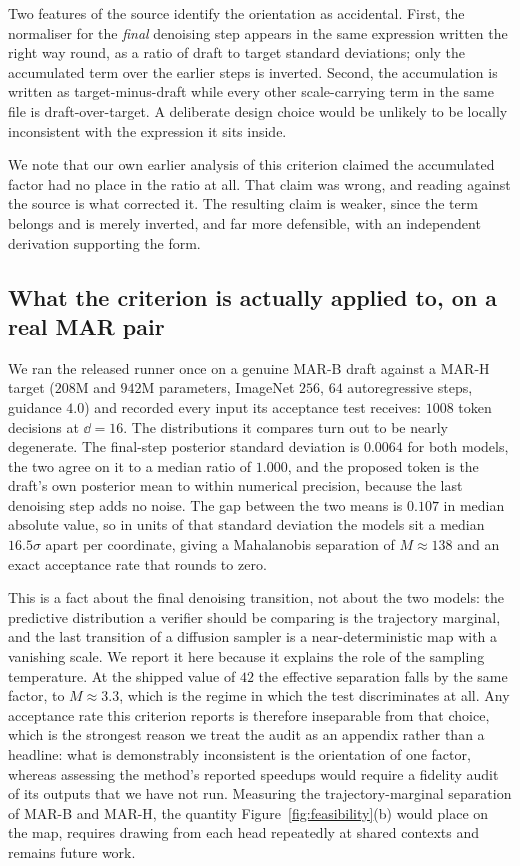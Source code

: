 Two features of the source identify the orientation as accidental. First, the normaliser for the
\emph{final} denoising step appears in the same expression written the right way round, as a ratio of
draft to target standard deviations; only the accumulated term over the earlier steps is inverted.
Second, the accumulation is written as target-minus-draft while every other scale-carrying term in the
same file is draft-over-target. A deliberate design choice would be unlikely to be locally
inconsistent with the expression it sits inside.

We note that our own earlier analysis of this criterion claimed the accumulated factor had no place in
the ratio at all. That claim was wrong, and reading \citet{zhang2025fastardiff} against the source is
what corrected it. The resulting claim is weaker, since the term belongs and is merely inverted, and far more
defensible, with an independent derivation supporting the form.

\subsection{What the criterion is actually applied to, on a real MAR pair}
\label{app:e06}

We ran the released runner once on a genuine MAR-B draft against a MAR-H target
($208$M and $942$M parameters, ImageNet $256$, $64$ autoregressive steps, guidance $4.0$) and
recorded every input its acceptance test receives: $1008$ token decisions at $\dd = 16$. The
distributions it compares turn out to be nearly degenerate. The final-step posterior standard
deviation is $0.0064$ for both models, the two agree on it to a median ratio of $1.000$, and the
proposed token is the draft's own posterior mean to within numerical precision, because the last
denoising step adds no noise. The gap between the two means is $0.107$ in median absolute value, so
in units of that standard deviation the models sit a median $16.5\sigma$ apart per coordinate,
giving a Mahalanobis separation of $M \approx 138$ and an exact acceptance rate that rounds to zero.

This is a fact about the final denoising transition, not about the two models: the predictive
distribution a verifier should be comparing is the trajectory marginal, and the last transition of a
diffusion sampler is a near-deterministic map with a vanishing scale. We report it here because it
explains the role of the sampling temperature. At the shipped value of $42$ the effective separation
falls by the same factor, to $M \approx 3.3$, which is the regime in which the test discriminates at
all. Any acceptance rate this criterion reports is therefore inseparable from that choice, which is
the strongest reason we treat the audit as an appendix rather than a headline: what is
demonstrably inconsistent is the orientation of one factor, whereas assessing the method's reported
speedups would require a fidelity audit of its outputs that we have not run. Measuring the
trajectory-marginal separation of MAR-B and MAR-H, the quantity Figure~\ref{fig:feasibility}(b)
would place on the map, requires drawing from each head repeatedly at shared contexts and remains
future work.

